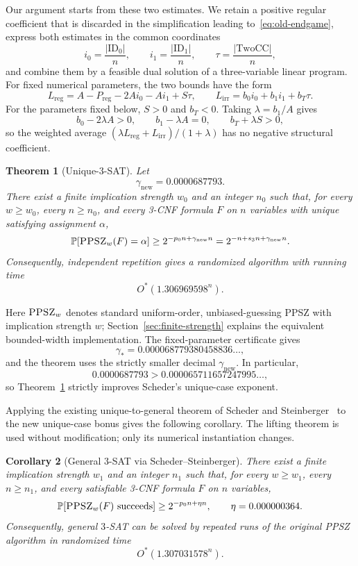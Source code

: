\documentclass[11pt]{article}
\newtheorem{theorem}{Theorem}[section]
\newtheorem{corollary}[theorem]{Corollary}
\newcommand{\PPSZ}{\textnormal{\textsc{PPSZ}}}
\newcommand{\TwoCC}{\mathrm{TwoCC}}
\newcommand{\ID}{\mathrm{ID}}
\newcommand{\Lreg}{L_{\mathrm{reg}}}
\newcommand{\Lirr}{L_{\mathrm{irr}}}
\newcommand{\Preg}{P_{\mathrm{reg}}}
\newcommand{\Prb}{\mathbb P}
\begin{document}
Our argument starts from these two estimates.  We retain a positive regular coefficient that is discarded in the simplification leading to~\eqref{eq:old-endgame}, express both estimates in the common coordinates
\[
 i_0=\frac{|\ID_0|}{n},
 \qquad
 i_1=\frac{|\ID_1|}{n},
 \qquad
 \tau=\frac{|\TwoCC|}{n},
\]
and combine them by a feasible dual solution of a three-variable linear program.  For fixed numerical parameters, the two bounds have the form
\[
 \Lreg=A-\Preg-2Ai_0-Ai_1+S\tau,
 \qquad
 \Lirr=b_0i_0+b_1i_1+b_T\tau.
\]
For the parameters fixed below, $S>0$ and $b_T<0$.  Taking $\lambda=b_1/A$ gives
\[
 b_0-2\lambda A>0,
 \qquad
 b_1-\lambda A=0,
 \qquad
 b_T+\lambda S>0,
\]
so the weighted average $(\lambda\Lreg+\Lirr)/(1+\lambda)$ has no negative structural coefficient.

\begin{theorem}[Unique-$3$-SAT]\label{thm:main}
Let
\[
 \gamma_{\mathrm{new}}=0.0000687793.
\]
There exist a finite implication strength $w_0$ and an integer $n_0$ such that, for every $w\ge w_0$, every $n\ge n_0$, and every 3-CNF formula $F$ on $n$ variables with unique satisfying assignment $\alpha$,
\[
 \Prb[\PPSZ_w(F)=\alpha]
 \ge 2^{-p_0n+\gamma_{\mathrm{new}}n}
 =2^{-n+s_3n+\gamma_{\mathrm{new}}n}.
\]
Consequently, independent repetition gives a randomized algorithm with running time
\[
 O^*(1.306969598^n).
\]
\end{theorem}

Here $\PPSZ_w$ denotes standard uniform-order, unbiased-guessing PPSZ with implication strength $w$; Section~\ref{sec:finite-strength} explains the equivalent bounded-width implementation.  The fixed-parameter certificate gives
\[
 \gamma_*=0.000068779380458836\ldots,
\]
and the theorem uses the strictly smaller decimal $\gamma_{\mathrm{new}}$.  In particular,
\[
 0.0000687793
 >0.000065711657247995\ldots,
\]
so Theorem~\ref{thm:main} strictly improves Scheder's unique-case exponent.

Applying the existing unique-to-general theorem of Scheder and Steinberger~\cite{SchederSteinberger} to the new unique-case bonus gives the following corollary.  The lifting theorem is used without modification; only its numerical instantiation changes.

\begin{corollary}[General $3$-SAT via Scheder--Steinberger]\label{cor:general}
There exist a finite implication strength $w_1$ and an integer $n_1$ such that, for every $w\ge w_1$, every $n\ge n_1$, and every satisfiable 3-CNF formula $F$ on $n$ variables,
\[
 \Prb[\PPSZ_w(F)\text{ succeeds}]
 \ge 2^{-p_0n+\eta n},
 \qquad
 \eta=0.000000364.
\]
Consequently, general $3$-SAT can be solved by repeated runs of the original PPSZ algorithm in randomized time
\[
 O^*(1.307031578^n).
\]
\end{corollary}
\end{document}
